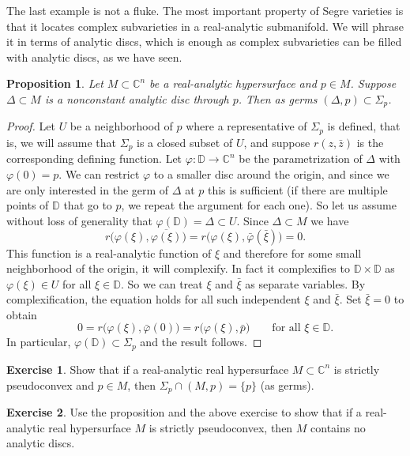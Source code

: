 \documentclass[12pt,openany]{book}
\newcommand{\C}{{\mathbb{C}}}
\newcommand{\D}{{\mathbb{D}}}
\theoremstyle{plain}
\newtheorem{prop}[thm]{Proposition}
\theoremstyle{remark}
\theoremstyle{definition}
\newenvironment{exbox}{%
    \def\FrameCommand{\vrule width 1pt \relax\hspace {10pt}}%
    \MakeFramed {\advance \hsize -\width \FrameRestore }%
}{%
    \endMakeFramed
}
\theoremstyle{exercise}
\newtheorem{exercise}{Exercise}[section]
\theoremstyle{example}
\begin{document}
The last example is not a fluke.
The most important property of Segre varieties is that it locates complex
subvarieties in a real-analytic submanifold.
We will phrase it in terms of analytic discs, which is
enough as complex subvarieties can be filled with analytic discs,
as we have seen.

\begin{prop}
Let $M \subset \C^n$ be a real-analytic hypersurface and $p \in M$.
Suppose $\Delta \subset M$ is a nonconstant analytic disc
through $p$.  Then as germs $(\Delta,p) \subset \Sigma_p$.
\end{prop}

\begin{proof}
Let $U$ be a neighborhood of $p$ where a representative
of $\Sigma_p$ is defined, that is, we will assume that $\Sigma_p$ is
a closed subset of $U$, and suppose $r(z,\bar{z})$ is the corresponding
defining function.
Let $\varphi \colon \D \to \C^n$ be the parametrization of $\Delta$
with $\varphi(0) = p$.  We can restrict $\varphi$ to a smaller disc around the
origin, and since we are only interested in the germ of $\Delta$ at $p$ this
is sufficient (if there are multiple points of $\D$
that go to $p$, we repeat the argument for each one).
So let us assume without loss of generality that $\varphi(\D) = \Delta \subset U$.
Since $\Delta \subset M$ we have
\begin{equation*}
r\bigl(\varphi(\xi),\overline{\varphi(\xi)}\bigr) =
r\bigl(\varphi(\xi),\bar{\varphi}(\bar{\xi})\bigr) = 0 .
\end{equation*}
This function is a real-analytic function of $\xi$ and therefore for some
small neighborhood of the origin, it will complexify.  In fact it complexifies
to $\D \times \D$ as $\varphi(\xi) \in U$ for all $\xi \in \D$.
So we can treat $\xi$ and $\bar{\xi}$ as separate variables.  By
complexification, the equation holds for all such independent
$\xi$ and $\bar{\xi}$.  Set $\bar{\xi} = 0$ to obtain
\begin{equation*}
0 =
r\bigl(\varphi(\xi),\bar{\varphi}(0)\bigr) =
r\bigl(\varphi(\xi),\bar{p}\bigr) 
\qquad \text{for all $\xi \in \D$}.
\end{equation*}
In particular, $\varphi(\D) \subset \Sigma_p$ and the result follows.
\end{proof}

\begin{exbox}
\begin{exercise}
Show that if a real-analytic real hypersurface $M \subset \C^n$ is strictly pseudoconvex and $p \in M$, then $\Sigma_p \cap
(M,p) = \{p\}$ (as germs).
\end{exercise}

\begin{exercise}
Use the proposition and the above exercise to show that if a real-analytic
real hypersurface $M$ is strictly 
pseudoconvex, then $M$ contains no analytic discs.
\end{exercise}
\end{exbox}
\end{document}
